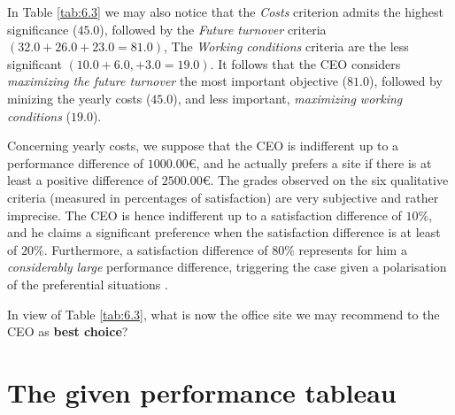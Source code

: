 In Table \ref{tab:6.3} we may also notice that the \emph{Costs} criterion admits the highest significance ($45.0$), followed by the \emph{Future turnover} criteria $(32.0 + 26.0 + 23.0 = 81.0)$, The \emph{Working conditions} criteria are the less significant $(10.0 + 6.0, + 3.0 = 19.0)$. It follows that the CEO considers \emph{maximizing the future turnover} the most important objective ($81.0$), followed by minizing the yearly costs ($45.0$), and less important, \emph{maximizing working conditions} ($19.0$). 

Concerning yearly costs, we suppose that the CEO is indifferent up to a performance difference of $1000.00$€, and he actually prefers a site if there is at least a positive difference of $2500.00$€. The grades observed on the six qualitative criteria (measured in percentages of satisfaction) are very subjective and rather imprecise. The CEO is hence indifferent up to a satisfaction difference of $10\%$, and he claims a significant preference when the satisfaction difference is at least of $20\%$.  Furthermore, a satisfaction difference of $80\%$ represents for him a \emph{considerably large} performance difference, triggering the case given a polarisation of the preferential situations \citep{BIS-2013}. 

In view of Table \ref{tab:6.3}, what is now the office site we may recommend to the CEO as \textbf{best choice}?

\section{The given performance tableau}
\label{sec:6.2}


